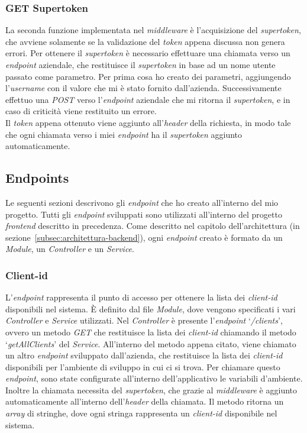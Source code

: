 \subsubsection{GET Supertoken}\label{subsubsec:get-supertoken}
La seconda funzione implementata nel \textit{middleware} è l'acquisizione del \textit{supertoken}, che avviene solamente se la validazione del \textit{token} appena discussa non genera errori.
Per ottenere il \textit{supertoken} è necessario effettuare una chiamata verso un \textit{endpoint} aziendale, che restituisce il \textit{supertoken} in base ad un nome utente passato come parametro.
Per prima cosa ho creato dei parametri, aggiungendo l'\textit{username} con il valore che mi è stato fornito dall'azienda.
Successivamente effettuo una \textit{POST} verso l'\textit{endpoint} aziendale che mi ritorna il \textit{supertoken}, e in caso di criticità viene restituito un errore.\\
Il \textit{token} appena ottenuto viene aggiunto all'\textit{header} della richiesta, in modo tale che ogni chiamata verso i miei \textit{endpoint} ha il \textit{supertoken} aggiunto automaticamente.

\subsection{Endpoints}\label{subsec:endpoints}
Le seguenti sezioni descrivono gli \textit{endpoint} che ho creato all'interno del mio progetto. Tutti gli \textit{endpoint} sviluppati 
sono utilizzati all'interno del progetto \textit{frontend} descritto in precedenza.
Come descritto nel capitolo dell'architettura (in sezione~\ref{subsec:architettura-backend}), ogni \textit{endpoint} creato è formato da un \textit{Module}, un \textit{Controller} e un \textit{Service}.

\subsubsection{Client-id}\label{subsubsec:client-id}
L'\textit{endpoint} rappresenta il punto di accesso per ottenere la lista dei \textit{client-id} disponibili nel sistema.
È definito dal file \textit{Module}, dove vengono specificati i vari \textit{Controller} e \textit{Service} utilizzati.
Nel \textit{Controller} è presente l'\textit{endpoint} `\textit{/clients}', ovvero un metodo \textit{GET} che restituisce la lista dei \textit{client-id} chiamando il metodo `\textit{getAllClients}' del \textit{Service}.
All’interno del metodo appena citato, viene chiamato un altro \textit{endpoint} sviluppato dall'azienda, che restituisce 
la lista dei \textit{client-id} disponibili per l'ambiente di sviluppo in cui ci si trova.
Per chiamare questo \textit{endpoint}, sono state configurate all'interno dell'applicativo le variabili d'ambiente.
Inoltre la chiamata necessita del \textit{supertoken}, che grazie al \textit{middleware} è aggiunto automaticamente all'interno 
dell'\textit{header} della chiamata.
Il metodo ritorna un \textit{array} di stringhe, dove ogni stringa rappresenta un \textit{client-id} disponibile nel sistema.


